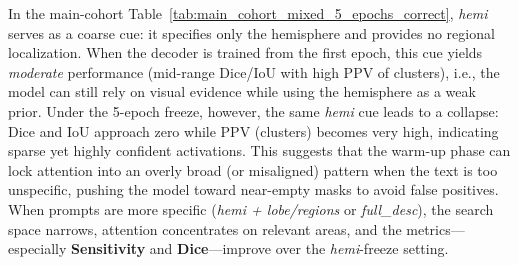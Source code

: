 \documentclass[a4paper,12pt]{article}
\begin{document}
In the main-cohort Table~\ref{tab:main_cohort_mixed_5_epochs_correct}, \emph{hemi} serves as a coarse cue: it specifies only the hemisphere and provides no regional localization. When the decoder is trained from the first epoch, this cue yields \emph{moderate} performance (mid-range Dice/IoU with high PPV of clusters), i.e., the model can still rely on visual evidence while using the hemisphere as a weak prior. Under the 5-epoch freeze, however, the same \emph{hemi} cue leads to a collapse: Dice and IoU approach zero while PPV (clusters) becomes very high, indicating sparse yet highly confident activations. This suggests that the warm-up phase can lock attention into an overly broad (or misaligned) pattern when the text is too unspecific, pushing the model toward near-empty masks to avoid false positives. When prompts are more specific (\emph{hemi + lobe/regions} or \emph{full\_desc}), the search space narrows, attention concentrates on relevant areas, and the metrics—especially \textbf{Sensitivity} and \textbf{Dice}—improve over the \emph{hemi}-freeze setting.
\end{document}

